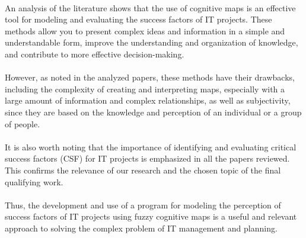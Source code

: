 \documentclass{article}
\begin{document}
\begin{minipage}{0.49\textwidth}
    ~\\
    An analysis of the literature shows that the use of cognitive maps is an effective tool for modeling and evaluating the success factors of IT projects. These methods allow you to present complex ideas and information in a simple and understandable form, improve the understanding and organization of knowledge, and contribute to more effective decision-making.\\
    ~\\
    However, as noted in the analyzed papers, these methods have their drawbacks, including the complexity of creating and interpreting maps, especially with a large amount of information and complex relationships, as well as subjectivity, since they are based on the knowledge and perception of an individual or a group of people.\\
    ~\\
    It is also worth noting that the importance of identifying and evaluating critical success factors (CSF) for IT projects is emphasized in all the papers reviewed. This confirms the relevance of our research and the chosen topic of the final qualifying work.\\
    ~\\
    Thus, the development and use of a program for modeling the perception of success factors of IT projects using fuzzy cognitive maps is a useful and relevant approach to solving the complex problem of IT management and planning.\\
    \begin{center}

\end{center}
\end{minipage}
\end{document}
